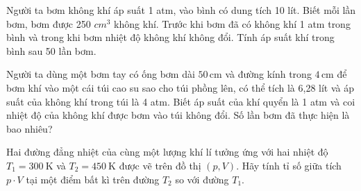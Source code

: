 \begin{ex}
Người ta bơm không khí áp suất 1 atm, vào bình có dung tích 10 lít. Biết mỗi lần bơm, bơm được 250 $c{{m}^{3}}$ không khí. Trước khi bơm đã có không khí 1 atm trong bình và trong khi bơm nhiệt độ không khí không đổi. Tính áp suất khí trong bình sau 50 lần bơm.
\end{ex}

\begin{ex}
Người ta dùng một bơm tay có ống bơm dài $50\,\text{cm}$ và đường kính trong $4\,\text{cm}$ để bơm khí vào một cái túi cao su sao cho túi phồng lên, có thể tích là 6,28 lít và áp suất của không khí trong túi là 4 atm. Biết áp suất của khí quyển là 1 atm và coi nhiệt độ của không khí được bơm vào túi không đổi. Số lần bơm đã thực hiện là bao nhiêu?
\end{ex}

\begin{ex}
Hai đường đẳng nhiệt của cùng một lượng khí lí tưởng ứng với hai nhiệt độ $T_1 = 300\ \mathrm{K}$ và $T_2 = 450\ \mathrm{K}$ được vẽ trên đồ thị $(p, V)$. Hãy tính tỉ số giữa tích $p \cdot V$ tại một điểm bất kì trên đường $T_2$ so với đường $T_1$.
\end{ex}

